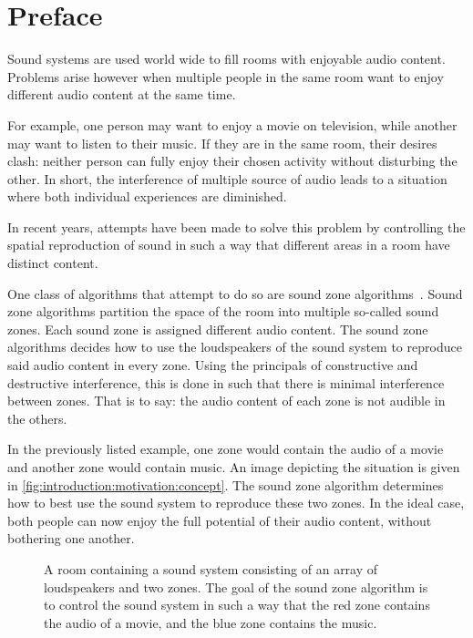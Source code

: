 \section{Preface}
\label{ch:introduction:preface}
Sound systems are used world wide to fill rooms with enjoyable audio content. 
Problems arise however when multiple people in the same room want to enjoy different audio content at the same time.

For example, one person may want to enjoy a movie on television, while another may want to listen to their music.
If they are in the same room, their desires clash: neither person can fully enjoy their chosen activity without disturbing
the other.
In short, the interference of multiple source of audio leads to a situation where both individual experiences are diminished.

In recent years, attempts have been made to solve this problem by controlling the spatial reproduction of sound in such
a way that different areas in a room have distinct content.

One class of algorithms that attempt to do so are sound zone algorithms~\cite{betlehem2015personal}.
Sound zone algorithms partition the space of the room into multiple so-called sound zones.
Each sound zone is assigned different audio content.
The sound zone algorithms decides how to use the loudspeakers of the sound system to reproduce said audio content in every zone.
Using the principals of constructive and destructive interference, this is done in such that there is minimal interference between zones.
That is to say: the audio content of each zone is not audible in the others.

In the previously listed example, one zone would contain the audio of a movie and another zone would contain music.
An image depicting the situation is given in \autoref{fig:introduction:motivation:concept}.
The sound zone algorithm determines how to best use the sound system to reproduce these two zones.
In the ideal case, both people can now enjoy the full potential of their audio content, without bothering one another.

\begin{figure}[]
    \centering
    \scalebox{1.0}{}
    \caption{A room containing a sound system consisting of an array of loudspeakers and two zones.
                The goal of the sound zone algorithm is to control the sound system in such a way that the red zone
                contains the audio of a movie, and the blue zone contains the music.}
    \label{fig:introduction:motivation:concept}
\end{figure}

